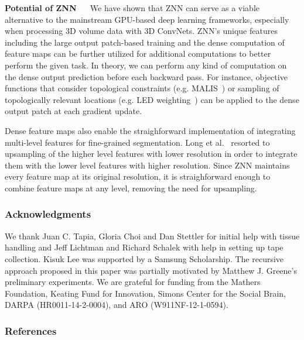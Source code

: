 \documentclass{article} %
\begin{document}
{\bf Potential of ZNN}
$\quad$
We have shown that ZNN can serve as a viable alternative to the mainstream GPU-based deep learning frameworks, especially when processing 3D volume data with 3D ConvNets. ZNN's unique features including the large output patch-based training and the dense computation of feature maps can be further utilized for additional computations to better perform the given task. In theory, we can perform any kind of computation on the dense output prediction before each backward pass. For instance, objective functions that consider topological constraints (e.g. MALIS~\cite{Turaga2009}) or sampling of topologically relevant locations (e.g. LED weighting~\cite{Huang2014}) can be applied to the dense output patch at each gradient update.

Dense feature maps also enable the straighforward implementation of integrating multi-level features for fine-grained segmentation. Long et al.~\cite{Long2015} resorted to upsampling of the higher level features with lower resolution in order to integrate them with the lower level features with higher resolution. Since ZNN maintains every feature map at its original resolution, it is straighforward enough to combine feature maps at any level, removing the need for upsampling.

\subsubsection*{Acknowledgments}
We thank Juan C. Tapia, Gloria Choi and Dan Stettler for initial help with tissue handling and Jeff Lichtman and Richard Schalek with help in setting up tape collection. Kisuk Lee was supported by a Samsung Scholarship. The recursive approach proposed in this paper was partially motivated by Matthew J. Greene's preliminary experiments.  We are grateful for funding from the Mathers Foundation, Keating Fund for Innovation, Simons Center for the Social Brain, DARPA (HR0011-14-2-0004), and ARO (W911NF-12-1-0594).

\subsubsection*{References}
\end{document}
